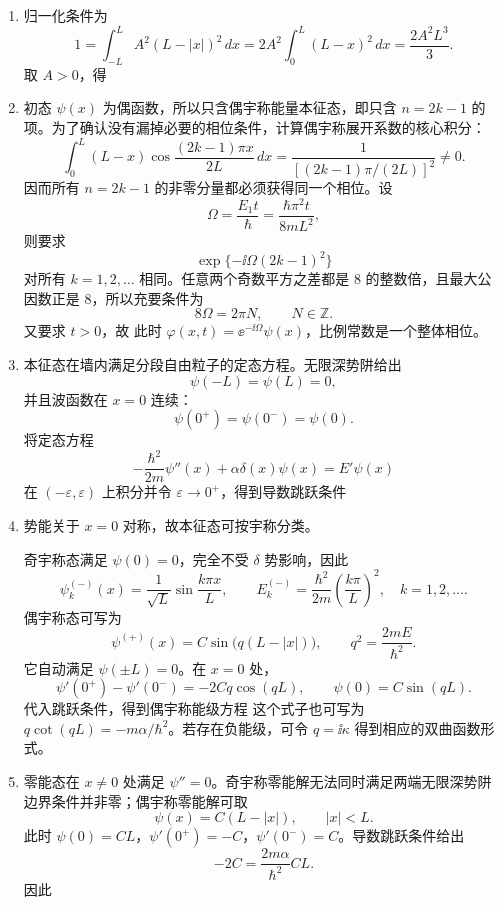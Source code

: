 \begin{question}[共 30 分]
\begin{solution}
\begin{enumerate}
{  }
  等价地，$n=2k-1$ 为偶宇称态，$n=2k$ 为奇宇称态：
  \[
  \psi_{2k-1}(x)=\frac{(-1)^{k-1}}{\sqrt L}\cos\frac{(2k-1)\pi x}{2L},\qquad
  \psi_{2k}(x)=\frac{(-1)^k}{\sqrt L}\sin\frac{k\pi x}{L}.
  \]
  \item 归一化条件为
  \[
  1=\int_{-L}^{L}A^2(L-|x|)^2\,dx
  =2A^2\int_0^L(L-x)^2\,dx
  =\frac{2A^2L^3}{3}.
  \]
  取 $A>0$，得
  \item 初态 $\psi(x)$ 为偶函数，所以只含偶宇称能量本征态，即只含 $n=2k-1$ 的项。为了确认没有漏掉必要的相位条件，计算偶宇称展开系数的核心积分：
  \[
  \int_0^L(L-x)\cos\frac{(2k-1)\pi x}{2L}\,dx
  =\frac{1}{\left[(2k-1)\pi/(2L)\right]^2}\ne 0.
  \]
  因而所有 $n=2k-1$ 的非零分量都必须获得同一个相位。设
  \[
  \Omega=\frac{E_1t}{\hbar}=\frac{\hbar\pi^2t}{8mL^2},
  \]
  则要求
  \[
  \exp\{-\ii\Omega(2k-1)^2\}
  \]
  对所有 $k=1,2,\dots$ 相同。任意两个奇数平方之差都是 $8$ 的整数倍，且最大公因数正是 $8$，所以充要条件为
  \[
  8\Omega=2\pi N,
  \qquad N\in\mathbb Z.
  \]
  又要求 $t>0$，故
  此时 $\varphi(x,t)=\ee^{-\ii\Omega}\psi(x)$，比例常数是一个整体相位。
  \item 本征态在墙内满足分段自由粒子的定态方程。无限深势阱给出
  \[
  \psi(-L)=\psi(L)=0,
  \]
  并且波函数在 $x=0$ 连续：
  \[
  \psi(0^+)=\psi(0^-)=\psi(0).
  \]
  将定态方程
  \[
  -\frac{\hbar^2}{2m}\psi''(x)+\alpha\delta(x)\psi(x)=E'\psi(x)
  \]
  在 $(-\varepsilon,\varepsilon)$ 上积分并令 $\varepsilon\to0^+$，得到导数跳跃条件
  \item 势能关于 $x=0$ 对称，故本征态可按宇称分类。

  奇宇称态满足 $\psi(0)=0$，完全不受 $\delta$ 势影响，因此
  \[
  \psi_k^{(-)}(x)=\frac{1}{\sqrt L}\sin\frac{k\pi x}{L},\qquad
  E_k^{(-)}=\frac{\hbar^2}{2m}\left(\frac{k\pi}{L}\right)^2,
  \quad k=1,2,\dots .
  \]
  偶宇称态可写为
  \[
  \psi^{(+)}(x)=C\sin\bigl(q(L-|x|)\bigr),\qquad q^2=\frac{2mE}{\hbar^2}.
  \]
  它自动满足 $\psi(\pm L)=0$。在 $x=0$ 处，
  \[
  \psi'(0^+)-\psi'(0^-)=-2Cq\cos(qL),\qquad \psi(0)=C\sin(qL).
  \]
  代入跳跃条件，得到偶宇称能级方程
  这个式子也可写为 $q\cot(qL)=-m\alpha/\hbar^2$。若存在负能级，可令 $q=\ii\kappa$ 得到相应的双曲函数形式。
  \item 零能态在 $x\ne0$ 处满足 $\psi''=0$。奇宇称零能解无法同时满足两端无限深势阱边界条件并非零；偶宇称零能解可取
  \[
  \psi(x)=C(L-|x|),\qquad |x|<L.
  \]
  此时 $\psi(0)=CL$，$\psi'(0^+)=-C$，$\psi'(0^-)=C$。导数跳跃条件给出
  \[
  -2C=\frac{2m\alpha}{\hbar^2}CL.
  \]
  因此
\end{enumerate}
\end{solution}
\end{question}

